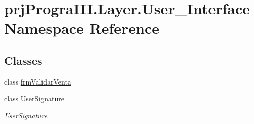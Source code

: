 \hypertarget{namespaceprj_progra_i_i_i_1_1_layer_1_1_user___interface}{}\section{prj\+Progra\+I\+I\+I.\+Layer.\+User\+\_\+\+Interface Namespace Reference}
\label{namespaceprj_progra_i_i_i_1_1_layer_1_1_user___interface}
\subsection*{Classes}
\begin{DoxyCompactItemize}
\item 
class \hyperlink{classprj_progra_i_i_i_1_1_layer_1_1_user___interface_1_1frm_validar_venta}{frm\+Validar\+Venta}
\item 
class \hyperlink{classprj_progra_i_i_i_1_1_layer_1_1_user___interface_1_1_user_signature}{User\+Signature}
\begin{DoxyCompactList}\small\item\em \hyperlink{classprj_progra_i_i_i_1_1_layer_1_1_user___interface_1_1_user_signature}{User\+Signature} \end{DoxyCompactList}\end{DoxyCompactItemize}
